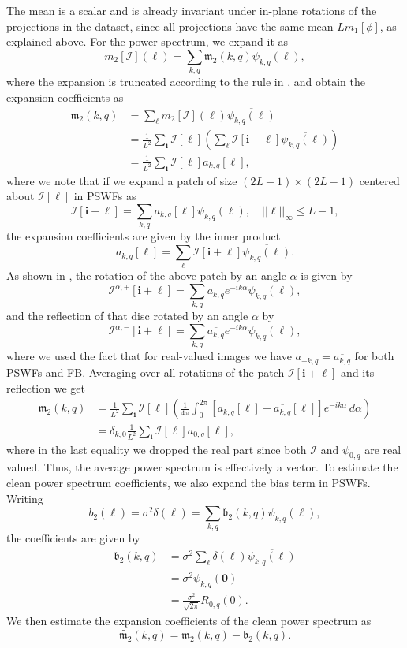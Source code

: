 \documentclass[english,11pt]{article}
\newcommand{\1}{\mathbf{1}}
\newcommand{\II}{\mathcal{I}}
\newcommand{\mb}{\mathbf}
\newcommand{\mk}{\mathfrak}
\newcommand*\Bell{\ensuremath{\boldsymbol\ell}}
\numberwithin{equation}{section}
\theoremstyle{plain}
\theoremstyle{definition}
\theoremstyle{remark}
\theoremstyle{plain}
\theoremstyle{remark}
\theoremstyle{plain}
\theoremstyle{plain}
\begin{document}
The mean is a scalar and is already invariant under in-plane rotations of the projections in the dataset, since all projections have the same mean $Lm_1[\phi]$, as explained above. For the power spectrum, we expand it as
\[ m_2[\II](\Bell) =
\sum_{k,q}\mathfrak{m}_2(k,q)\psi_{k,q}(\Bell),\]
where the expansion is truncated according to the rule in \cite{landa2017steerable}, and obtain the expansion coefficients as
\[\begin{aligned} 
\mathfrak{m}_2(k,q) &=
\sum_{\Bell}m_2[\II](\Bell)\overline{\psi_{k,q}(\Bell)}\\
&=
\frac{1}{L^2}\sum_{\mb i}\II[\Bell]\left(\sum_{\Bell}\II[\mb i+\Bell]\overline{\psi_{k,q}(\Bell)}\right)\\
&= \frac{1}{L^2}\sum_{\mb i}\II[\Bell]a_{k,q}[\Bell], \end{aligned}\]
where we note that if we expand a patch of size $(2L-1) \times (2L-1)$ centered about $\II[\Bell]$ in PSWFs as
\[ \II[\mb i + \Bell] = \sum_{k,q}a_{k,q}[\Bell]\psi_{k,q}(\Bell),\quad ||\Bell||_{\infty}\leq L-1,\]
the expansion coefficients are given by the inner product
\[ a_{k,q}[\Bell] = \sum_{\Bell}\II[\mb i + \Bell]\overline{\psi_{k,q}(\Bell)}.\]
As shown in \cite{landa2017steerable, zhao2016fast}, the rotation of the above patch by an angle $\alpha$ is given by
\[ \II^{\alpha,+}[\mb i+\Bell] = \sum_{k,q}a_{k,q}e^{-ik\alpha}\psi_{k,q}(\Bell),\]
and the reflection of that disc rotated by an angle $\alpha$ by
\[ \II^{\alpha,-}[\mb i+\Bell] = \sum_{k,q}\overline{a_{k,q}}e^{-ik\alpha}\psi_{k,q}(\Bell),\]
where we used the fact that for real-valued images we have $a_{-k,q}=\overline{a_{k,q}}$ for both PSWFs and FB. Averaging over all rotations of the patch $\II[\mb i + \Bell]$ and its reflection we get
\[\begin{aligned} 
\mathfrak{m}_2(k,q) &= \frac{1}{L^2}\sum_{\mb i}\II[\Bell]\left(\frac{1}{4\pi}\int_0^{2\pi}[a_{k,q}[\Bell] +
\overline{a_{k,q}}[\Bell]]e^{-ik\alpha}\, d\alpha\right)\\ 
&= \delta_{k,0} \frac{1}{L^2}\sum_{\mb i}\II[\Bell]a_{0,q}[\Bell], \end{aligned}\]
where in the last equality we dropped the real part since both
$\II$ and $\psi_{0,q}$ are real valued.
Thus, the average power spectrum is effectively a vector. To estimate the clean power spectrum coefficients, we also expand the bias term in PSWFs. Writing
\[ b_2(\Bell) = \sigma^2\delta(\Bell) = \sum_{k,q}\mathfrak{b}_2(k,q)\psi_{k,q}(\Bell),\]
the coefficients are given by
\[\begin{aligned} 
\mathfrak{b}_2(k,q) &= \sigma^2\sum_{\Bell}\delta(\Bell)\overline{\psi_{k,q}(\Bell)}\\
&= \sigma^2\overline{\psi_{k,q}(\mb 0)}\\
&= \frac{\sigma^2}{\sqrt{2\pi}}R_{0,q}(0). \end{aligned}\]
We then estimate the expansion coefficients of the clean power spectrum as
\[ \widetilde{\mk m_2}(k,q) = \mk m_2(k,q) - \mk b_2(k,q).\]
\end{document}
